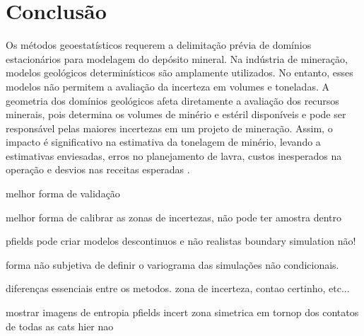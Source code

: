 \chapter{Conclusão}

Os métodos geoestatísticos requerem a delimitação prévia de domínios estacionários para modelagem do depósito mineral. Na indústria de mineração, modelos geológicos determinísticos são amplamente utilizados. No entanto, esses modelos não permitem a avaliação da incerteza em volumes e toneladas. A geometria dos domínios geológicos afeta diretamente a avaliação dos recursos minerais, pois determina os volumes de minério e estéril disponíveis e pode ser responsável pelas maiores incertezas em um projeto de mineração. Assim, o impacto é significativo na estimativa da tonelagem de minério, levando a estimativas enviesadas, erros no planejamento de lavra, custos inesperados na operação e desvios nas receitas esperadas \cite{srivastava2005probabilistic}.



melhor forma de validação 

melhor forma de calibrar as zonas de incertezas, não pode ter amostra dentro

pfields pode criar modelos descontinuos e não realistas boundary simulation não!

forma não subjetiva de definir o variograma das simulações não condicionais.

diferenças essenciais entre os metodos. zona de incerteza, contao certinho, etc...

mostrar imagens de entropia pfields incert zona simetrica em tornop dos contatos de todas as cats hier nao 